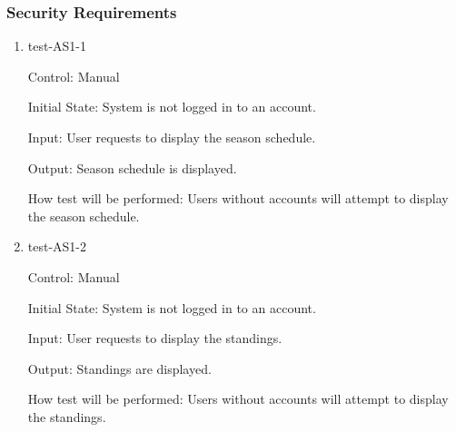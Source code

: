 \documentclass[12pt, titlepage]{article}
\begin{document}

\subsubsection{Security Requirements}

\begin{enumerate}

  \item{test-AS1-1\\}

  Control: Manual

  Initial State: System is not logged in to an account.

  Input: User requests to display the season schedule.

  Output: Season schedule is displayed.

  How test will be performed: Users without accounts will attempt to display
  the season schedule.

  \item{test-AS1-2\\}

  Control: Manual

  Initial State: System is not logged in to an account.

  Input: User requests to display the standings.

  Output: Standings are displayed.

  How test will be performed: Users without accounts will attempt to display
  the standings.









\end{enumerate}
\end{document}
